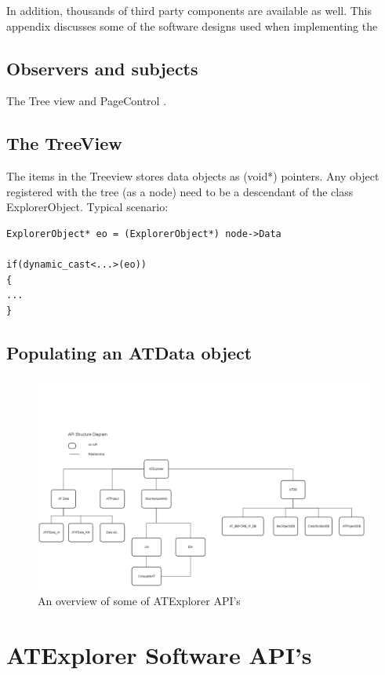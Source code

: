 \documentclass[11pt,fleqn]{book} %
\begin{document}
\begin{appendices}
In addition, thousands of third party components are available as well.
This appendix discusses some of the software designs used when implementing the \ate


\subsection{Observers and subjects}
The Tree view and PageControl .


\subsection{The TreeView}
The items in the Treeview stores data objects as (void*) pointers. Any object registered with the tree (as a node) need to be a descendant of the class ExplorerObject.
Typical scenario:
\begin{verbatim}
ExplorerObject* eo = (ExplorerObject*) node->Data

if(dynamic_cast<...>(eo))
{
...
}
\end{verbatim}

\subsection{Populating an ATData object}

\begin{figure}[h]
\centering\includegraphics[scale=0.35]{ATExplorer_APIs}
\caption{An overview of some of ATExplorer API's}
\end{figure}


\section{ATExplorer Software API's}

\end{appendices}
\end{document}

